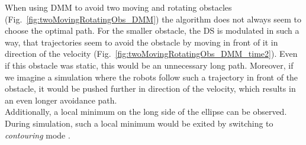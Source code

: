 When using DMM to avoid two moving and rotating obstacles (Fig.~\ref{fig:twoMovingRotatingObs_DMM}) the algorithm does not always seem to choose the optimal path. For the smaller obstacle, the DS is  modulated in such a way, that trajectories seem to  avoid the obstacle by moving in front of it in direction of the velocity (Fig.~\ref{fig:twoMovingRotatingObs_DMM_time2}). Even if this obstacle was static, this would be an unnecessary long path. Moreover, if we imagine a simulation where the robots follow such a trajectory in front of the obstacle, it  would be pushed further in direction of the velocity, which results in an even longer avoidance path.\\
Additionally, a local minimum on the long side of the ellipse can be observed. During simulation, such a local minimum would be exited by switching to \textit{contouring} mode \cite{khansari2012dynamical}.

